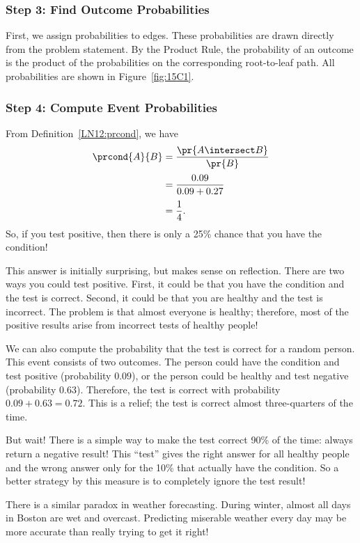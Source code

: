 \subsubsection*{Step 3: Find Outcome Probabilities}

First, we assign probabilities to edges.  These probabilities are
drawn directly from the problem statement.  By the Product Rule, the
probability of an outcome is the product of the probabilities on the
corresponding root-to-leaf path.  All probabilities are shown in
Figure~\ref{fig:15C1}.

\subsubsection*{Step 4: Compute Event Probabilities}

From Definition~\ref{LN12:prcond}, we have
\begin{align*}
\prcond{A}{B}	& = \frac{\pr{A \intersect B}}{\pr{B}} \\[2pt]
		& = \frac{0.09}{0.09 + 0.27} \\[2pt]
		& = \frac{1}{4}.
\end{align*}
%
So, if you test positive, then there is only a 25\% chance that you
have the condition!

This answer is initially surprising, but makes sense on reflection.
There are two ways you could test positive.  First, it could be that
you have the condition and the test is correct.  Second, it could be that you
are healthy and the test is incorrect.  The problem is that almost
everyone is healthy; therefore, most of the positive results arise
from incorrect tests of healthy people!

We can also compute the probability that the test is correct for a
random person.  This event consists of two outcomes.  The person could
have the condition and test positive (probability $0.09$), or the person
could be healthy and test negative (probability $0.63$).
Therefore, the test is correct with probability $0.09 + 0.63 = 0.72$.
This is a relief; the test is correct almost three-quarters of the
time.

But wait!  There is a simple way to make the test correct 90\% of the
time: always return a negative result!  This ``test'' gives the right
answer for all healthy people and the wrong answer only for the 10\%
that actually have the condition.  So a better strategy by this
measure is to completely ignore the test result!

There is a similar paradox in weather forecasting.  During winter,
almost all days in Boston are wet and overcast.  Predicting miserable
weather every day may be more accurate than really trying to get it
right!


